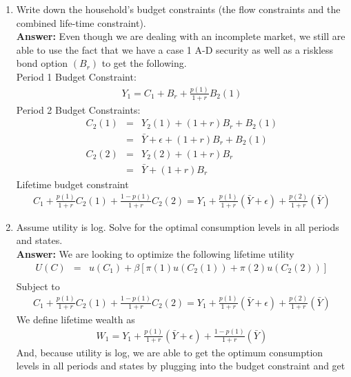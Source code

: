 \documentclass[11pt]{SelfArxOneColBMN}
\begin{document}
\begin{enumerate}
  \item Write down the household's budget constraints (the flow constraints and the combined life-time constraint).\\
  \indent \textbf{Answer: }Even though we are dealing with an incomplete market, we still are able to use the fact that we have a case 1 A-D security as well as a riskless bond option $(B_r)$ to get the following.\\
  Period 1 Budget Constraint:\\
  \begin{eqnarray*}
    Y_1 = C_1 + B_r + \frac{p(1)}{1 + r}B_2(1)
  \end{eqnarray*}
  Period 2 Budget Constraints:\\
  \begin{eqnarray*}
    C_2(1) &=& Y_2(1) + (1 + r)B_r + B_2(1)\\
    &=& \bar{Y} + \epsilon + (1 + r)B_r + B_2(1)\\
    C_2(2) &=& Y_2(2) + (1 + r)B_r\\
    &=& \bar{Y} + (1 + r)B_r
  \end{eqnarray*}
  Lifetime budget constraint
  \begin{eqnarray*}
    C_1 + \frac{p(1)}{1 + r}C_2(1) + \frac{1 - p(1)}{1 + r}C_2(2) = Y_1 + \frac{p(1)}{1 + r}(\bar{Y} + \epsilon) + \frac{p(2)}{1 + r}(\bar{Y})
  \end{eqnarray*}
  \item Assume utility is log. Solve for the optimal consumption levels in all periods and states.\\
  \textbf{Answer: }We are looking to optimize the following lifetime utility
  \begin{eqnarray*}
    U(C) &=& u(C_1) + \beta[\pi(1)u(C_2(1)) + \pi(2)u(C_2(2))]\\
  \end{eqnarray*}
  Subject to
  \begin{eqnarray*}
    C_1 + \frac{p(1)}{1 + r}C_2(1) + \frac{1 - p(1)}{1 + r}C_2(2) = Y_1 + \frac{p(1)}{1 + r}(\bar{Y} + \epsilon) + \frac{p(2)}{1 + r}(\bar{Y})
  \end{eqnarray*}
  We define lifetime wealth as
  \begin{eqnarray*}
    W_1 = Y_1 + \frac{p(1)}{1 + r}(\bar{Y} + \epsilon) + \frac{1 - p(1)}{1 + r}(\bar{Y})
  \end{eqnarray*}
  And, because utility is log, we are able to get the optimum consumption levels in all periods and states by plugging into the budget constraint and get

\end{enumerate}
\end{document}
